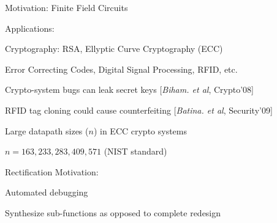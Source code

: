 \begin{frame}{\large Motivation: Finite Field Circuits}
\bi
	\item Applications:
	\bi
		\item Cryptography: RSA, Ellyptic Curve Cryptography (ECC) 
		\item Error Correcting Codes, Digital Signal Processing, RFID, etc.
		\pause
		\bi
			\item Crypto-system bugs can leak secret keys [{\it Biham. et al}, Crypto'08]
			\item RFID tag cloning could cause counterfeiting [{\it Batina. et al}, Security'09]
		\ei
		\pause
		\item Large datapath sizes ($n$) in ECC crypto systems 
		\bi
			\item $n=163, 233, 283, 409, 571$ (NIST standard)
		\ei
	\ei
	\pause
	\vspace{0.1in}
	\item Rectification Motivation: 
	\bi
		\item Automated debugging
		\item Synthesize sub-functions as opposed to complete redesign
	\ei
\ei
\end{frame}


